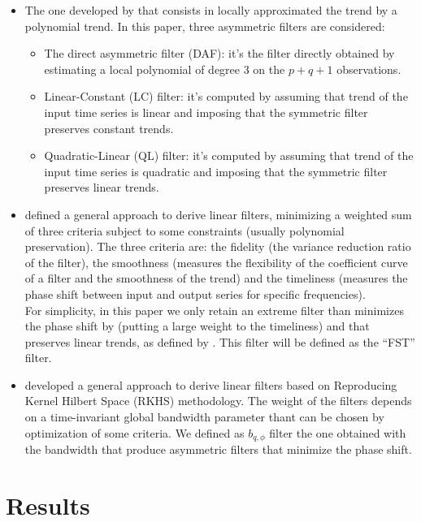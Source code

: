 \documentclass[
  12pt,
  ,
  a4paper]{article}
\begin{document}
\begin{itemize}
\item
  The one developed by \citet{proietti2008} that consists in locally approximated the trend by a polynomial trend. In this paper, three asymmetric filters are considered:

  \begin{itemize}
  \item
    The direct asymmetric filter (DAF): it's the filter directly obtained by estimating a local polynomial of degree 3 on the \(p+q+1\) observations.
  \item
    Linear-Constant (LC) filter: it's computed by assuming that trend of the input time series is linear and imposing that the symmetric filter preserves constant trends.
  \item
    Quadratic-Linear (QL) filter: it's computed by assuming that trend of the input time series is quadratic and imposing that the symmetric filter preserves linear trends.
  \end{itemize}
\item
  \citet{ch15HBSA} defined a general approach to derive linear filters, minimizing a weighted sum of three criteria subject to some constraints (usually polynomial preservation).
  The three criteria are: the fidelity (the variance reduction ratio of the filter), the smoothness (measures the flexibility of the coefficient curve of a filter and the smoothness of the trend) and the timeliness (measures the phase shift between input and output series for specific frequencies).\\
  For simplicity, in this paper we only retain an extreme filter than minimizes the phase shift by (putting a large weight to the timeliness) and that preserves linear trends, as defined by \citet{ch15HBSA}.
  This filter will be defined as the ``FST'' filter.
\item
  \citet{dagumbianconcini2008} developed a general approach to derive linear filters based on Reproducing Kernel Hilbert Space (RKHS) methodology.
  The weight of the filters depends on a time-invariant global bandwidth parameter thant can be chosen by optimization of some criteria.
  We defined as \(b_{q,\phi}\) filter the one obtained with the bandwidth that produce asymmetric filters that minimize the phase shift.
\end{itemize}

\hypertarget{results}{%
\section{Results}\label{results}}
\end{document}
